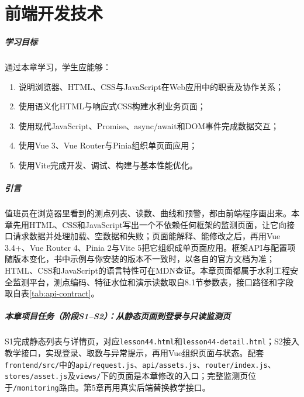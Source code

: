 \chapter{前端开发技术}

\paragraph*{学习目标}

通过本章学习，学生应能够：
\begin{enumerate}
\item 说明浏览器、HTML、CSS与JavaScript在Web应用中的职责及协作关系；
\item 使用语义化HTML与响应式CSS构建水利业务页面；
\item 使用现代JavaScript、Promise、async/await和DOM事件完成数据交互；
\item 使用Vue 3、Vue Router与Pinia组织单页面应用；
\item 使用Vite完成开发、调试、构建与基本性能优化。
\end{enumerate}

\paragraph*{引言}

值班员在浏览器里看到的测点列表、读数、曲线和预警，都由前端程序画出来。本章先用HTML、CSS和JavaScript写出一个不依赖任何框架的监测页面，让它向接口请求数据并处理加载、空数据和失败；页面能解释、能修改之后，再用Vue 3.4+、Vue Router 4、Pinia 2与Vite 5把它组织成单页面应用。框架API与配置项随版本变化，书中示例与你安装的版本不一致时，以各自的官方文档为准\cite{vueDocs,vueRouterDocs,piniaDocs,viteDocs}；HTML、CSS和JavaScript的语言特性可在MDN查证\cite{mdnWebDocs}。本章页面都属于水利工程安全监测平台，测点编码、特征水位和演示读数取自8.1节参数表，接口路径和字段取自表\ref{tab:api-contract}。

\begin{tipbox}
\paragraph{本章项目任务（阶段S1--S2）：从静态页面到登录与只读监测页}S1完成静态列表与详情页，对应\texttt{lesson44.html}和\texttt{lesson44-detail.html}；S2接入教学接口，实现登录、取数与异常提示，再用Vue组织页面与状态。配套\texttt{frontend/src/}中的\texttt{api/request.js}、\texttt{api/assets.js}、\texttt{router/index.js}、\texttt{stores/asset.js}及\texttt{views/}下的页面是本章修改的入口；完整监测页位于\texttt{/monitoring}路由。第5章再用真实后端替换教学接口。

\end{tipbox}

